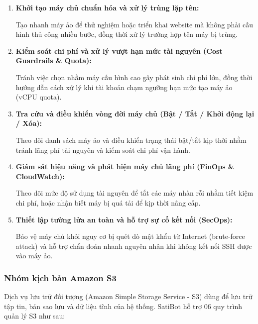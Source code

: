 \documentclass[a4paper,12pt]{article}
\begin{document}
\begin{enumerate}
  \item \textbf{Khởi tạo máy chủ chuẩn hóa và xử lý trùng lặp tên:}

Tạo nhanh máy ảo để thử nghiệm hoặc triển khai website mà không phải cấu hình thủ công nhiều bước, đồng thời xử lý trường hợp tên máy bị trùng.

  \item \textbf{Kiểm soát chi phí và xử lý vượt hạn mức tài nguyên (Cost Guardrails \& Quota):}

Tránh việc chọn nhầm máy cấu hình cao gây phát sinh chi phí lớn, đồng thời hướng dẫn cách xử lý khi tài khoản chạm ngưỡng hạn mức tạo máy ảo (vCPU quota).
  

  \item \textbf{Tra cứu và điều khiển vòng đời máy chủ (Bật / Tắt / Khởi động lại / Xóa):}

  Theo dõi danh sách máy ảo và điều khiển trạng thái bật/tắt kịp thời nhằm tránh lãng phí tài nguyên và kiểm soát chi phí vận hành.

  \item \textbf{Giám sát hiệu năng và phát hiện máy chủ lãng phí (FinOps \& CloudWatch):}

Theo dõi mức độ sử dụng tài nguyên để tắt các máy nhàn rỗi nhằm tiết kiệm chi phí, hoặc nhận biết máy bị quá tải để kịp thời nâng cấp.

  \item \textbf{Thiết lập tường lửa an toàn và hỗ trợ sự cố kết nối (SecOps):}

Bảo vệ máy chủ khỏi nguy cơ bị quét dò mật khẩu từ Internet (brute-force attack) và hỗ trợ chẩn đoán nhanh nguyên nhân khi không kết nối SSH được vào máy ảo.

\end{enumerate}

\subsubsection{Nhóm kịch bản Amazon S3}

Dịch vụ lưu trữ đối tượng (Amazon Simple Storage Service - S3) dùng để lưu trữ tập tin, bản sao lưu và dữ liệu tĩnh của hệ thống. SatiBot hỗ trợ 06 quy trình quản lý S3 như sau:
\end{document}
